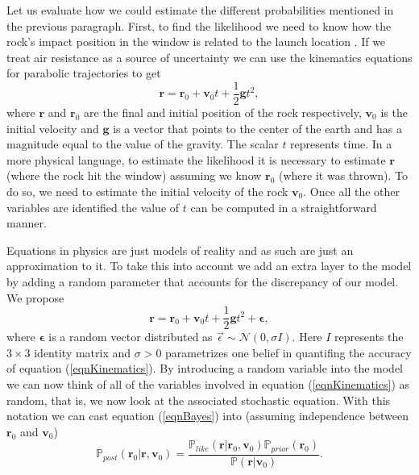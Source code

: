 \documentclass[12pt]{book}
\newcommand{\post}{\mathbb{P}_{post}}
\newcommand{\like}{\mathbb{P}_{like}}
\newcommand{\prior}{\mathbb{P}_{prior}}
\newcommand{\p}{\mathbb{P}}
\begin{document}
Let us evaluate how we could estimate the different probabilities mentioned in the previous paragraph. 
First, to find the likelihood
we need to know how the rock's impact position  in the window  is related to the launch location 
. If we treat air resistance as a source of uncertainty  we can use
the kinematics equations  for parabolic trajectories to get \cite{arnol2013mathematical}
\begin{equation}\label{eqnKinematics}
\textbf{r}=\textbf{r}_{0}+\textbf{v}_{0}t+\frac{1}{2}\textbf{g}t^{2},
\end{equation} 
where $\textbf{r}$ and $\textbf{r}_{0}$ are the final and initial position of the rock respectively, 
$\textbf{v}_{0}$ is 
the initial velocity  and $\textbf{g}$ is  a vector that points to the center of the earth and has a 
magnitude equal to the value of the gravity. The scalar $t$ represents time.
In a more physical language, to estimate the likelihood it is necessary to estimate $\textbf{r}$ (where the 
rock hit the window) assuming we know $\textbf{r}_{0}$ (where it was thrown). 
To do so,
we  need to estimate the initial velocity of the rock $\textbf{v}_{0}$. 
Once all the other variables are identified the value of $t$ can be computed in a straightforward manner. 

Equations in physics are just models of reality and as such are just an approximation to it. To take
this into account we add an extra layer to the model by adding a random parameter that accounts
for the discrepancy of our model. We propose 
\begin{equation*}
\textbf{r}=\textbf{r}_{0}+\textbf{v}_{0}t+\frac{1}{2}\textbf{g}t^{2}+\mathbf{\epsilon},
\end{equation*} 
where $\mathbf{\epsilon}$ is a random vector distributed as $\vec{\epsilon}\sim\mathscr{N}(0,\sigma I)$. Here $I$
represents the $3\times 3$ identity matrix and $\sigma>0$ parametrizes one belief in quantifing the 
accuracy  
of equation (\ref{eqnKinematics}).  By introducing a random variable into the model
we can now think of all of the variables involved  in equation (\ref{eqnKinematics})
as random, that is, we now look at the  associated stochastic equation. With this notation
we can cast equation (\ref{eqnBayes}) into  (assuming independence between $\textbf{r}_{0}$ and $\textbf{v}_{0}$)
\begin{equation}\label{eqnpostrock}
\post(\textbf{r}_{0}|\textbf{r},\textbf{v}_{0})=\frac{\like(\textbf{r}|\textbf{r}_{0},\textbf{v}_{0})
\prior(\textbf{r}_{0})}{\p(\textbf{r}|\textbf{v}_{0})}.
\end{equation}
\end{document}
